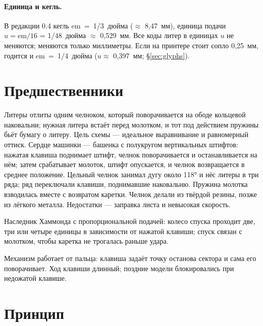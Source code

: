 \paragraph{Единица и кегль.} В редакции 0.4 кегль em~=~1/3~дюйма ($\approx$ 8,47~мм), единица подачи $u = \mathrm{em}/16$ = 1/48~дюйма $\approx$ 0,529~мм. Все коды литер в единицах $u$ не меняются; меняются только миллиметры. Если на принтере стоит сопло 0,25~мм, годится и em~=~1/4~дюйма ($u \approx$ 0,397~мм; \S\ref{sec:glyphs}).

\section{Предшественники}

\begin{description}[style=nextline,leftmargin=0pt]
  \item[Хаммонд (1880-е).] Литеры отлиты одним челноком, который поворачивается на ободе кольцевой наковальни; нужная литера встаёт перед молотком, и тот под действием пружины бьёт бумагу о литеру. Цель схемы — идеальное выравнивание и равномерный оттиск. Сердце машинки — башенка с полукругом вертикальных штифтов: нажатая клавиша поднимает штифт, челнок поворачивается и останавливается на нём; затем срабатывает молоток, штифт опускается, и челнок возвращается в среднее положение. Цельный челнок занимал дугу около 118° и нёс литеры в три ряда; ряд переключали клавиши, поднимавшие наковальню. Пружина молотка взводилась вместе с возвратом каретки. Челнок делали из твёрдой резины, позже из лёгкого металла. Недостатки — заправка листа и невысокая скорость.
  \item[Varityper.] Наследник Хаммонда с пропорциональной подачей: колесо спуска проходит две, три или четыре единицы в зависимости от нажатой клавиши; спуск связан с молотком, чтобы каретка не трогалась раньше удара.
  \item[Комптометр (1887).] Механизм работает от пальца: клавиша задаёт точку останова сектора и сама его поворачивает. Ход клавиши длинный; поздние модели блокировались при недожатой клавише.
\end{description}

\section{Принцип}

